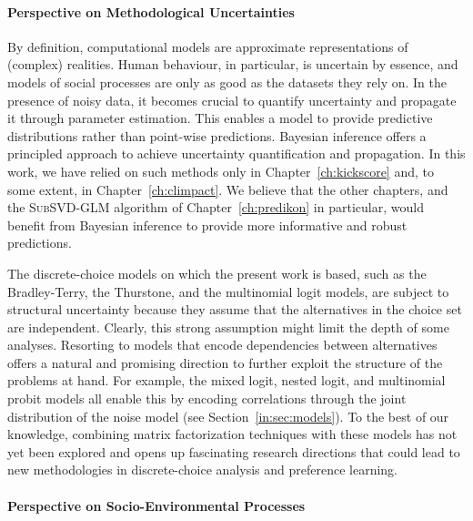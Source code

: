 \paragraph{Perspective on Methodological Uncertainties}

By definition, computational models are approximate representations of (complex) realities.
Human behaviour, in particular, is uncertain by essence, and models of social processes are only as good as the datasets they rely on.
In the presence of noisy data, it becomes crucial to quantify uncertainty and propagate it through parameter estimation.
This enables a model to provide predictive distributions rather than point-wise predictions.
Bayesian inference offers a principled approach to achieve uncertainty quantification and propagation.
In this work, we have relied on such methods only in Chapter~\ref{ch:kickscore} and, to some extent, in Chapter~\ref{ch:climpact}.
We believe that the other chapters, and the \textsc{SubSVD-GLM} algorithm of Chapter~\ref{ch:predikon} in particular, would benefit from Bayesian inference to provide more informative and robust predictions.

The discrete-choice models on which the present work is based, such as the Bradley-Terry, the Thurstone, and the multinomial logit models, are subject to structural uncertainty because they assume that the alternatives in the choice set are independent.
Clearly, this strong assumption might limit the depth of some analyses.
Resorting to models that encode dependencies between alternatives offers a natural and promising direction to further exploit the structure of the problems at hand.
For example, the mixed logit, nested logit, and multinomial probit models all enable this by encoding correlations through the joint distribution of the noise model (see Section~\ref{in:sec:models}).
To the best of our knowledge, combining matrix factorization techniques with these models has not yet been explored and opens up fascinating research directions that could lead to new methodologies in discrete-choice analysis and preference learning.

\paragraph{Perspective on Socio-Environmental Processes}

